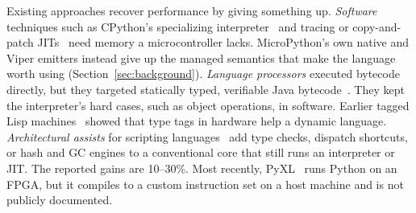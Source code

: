 Existing approaches recover performance by giving something up.
\emph{Software} techniques such as CPython's specializing
interpreter~\cite{pep659} and tracing or copy-and-patch
JITs~\cite{bolz2009pypy,pep744} need memory a microcontroller lacks.
MicroPython's own native and Viper emitters instead give up the managed
semantics that make the language worth using (Section~\ref{sec:background}).
\emph{Language processors} executed bytecode directly, but they targeted
statically typed, verifiable Java bytecode~\cite{mcghan1998,schoeberl2008,porthouse2005}.
They kept the interpreter's hard cases, such as object operations, in
software. Earlier tagged Lisp machines~\cite{moon1985} showed that
type tags in hardware help a dynamic language. \emph{Architectural
assists} for scripting languages~\cite{kim2017typed,choi2017shortcut,gope2017php,maas2018gc}
add type checks, dispatch shortcuts, or hash and GC
engines to a conventional core that still runs an interpreter or JIT.
The reported gains are 10--30\%.
Most recently, PyXL~\cite{pyxl2025} runs Python on an FPGA, but it
compiles to a custom instruction set on a host machine and is not
publicly documented.


